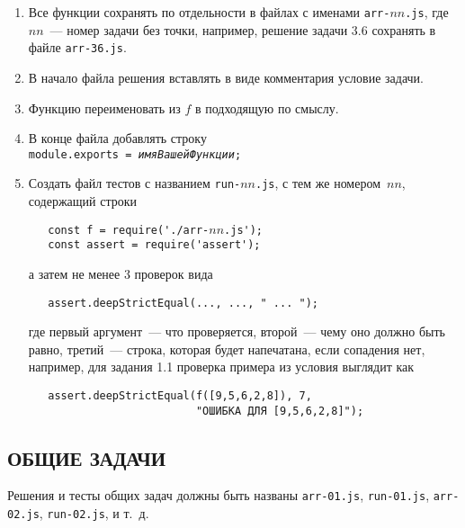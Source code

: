 \documentclass{article}
\begin{document}
\begin{enumerate}[nolistsep]
    \item
    Все функции сохранять по отдельности в файлах с именами \texttt{arr-$nn$.js}, где $nn$~--- номер задачи без точки, например, решение задачи 3.6 сохранять в файле \texttt{arr-36.js}.
    \item
    В начало файла решения вставлять в виде комментария условие задачи. 
    \item
    Функцию переименовать из $f$ в подходящую по смыслу. 
    \item
    В конце файла добавлять строку
    \\[.7mm]
    \texttt{module.exports = \textit{имяВашейФункции};}
    \item
    Создать файл тестов с названием \texttt{run-$nn$.js}, с тем же номером~$nn$, содержащий строки

    \smallskip
    \verb!   const f = require('./arr-!$nn$\verb!.js');!\\
    \verb!   const assert = require('assert');!

    \smallskip
    \noindent
    а затем не менее 3 проверок вида 
    
    \smallskip
    \verb!   assert.deepStrictEqual(..., ..., " ... ");!

    \smallskip
    \noindent
    где первый аргумент~--- что проверяется, второй~--- чему оно должно быть равно,
    третий~--- строка, которая будет напечатана, если сопадения нет, например, для задания 1.1
    проверка примера из условия выглядит как

    \smallskip
    \verb!   assert.deepStrictEqual(f([9,5,6,2,8]), 7,!\\
    \verb!                          "ОШИБКА ДЛЯ [9,5,6,2,8]");!

\end{enumerate}

\subsection*{ОБЩИЕ ЗАДАЧИ}
\def\twodigit#1{%
\ifnum#1<10 0\fi 
\number#1}

Решения и тесты общих задач должны быть названы \texttt{arr-01.js}, \texttt{run-01.js}, \texttt{arr-02.js}, \texttt{run-02.js}, и т.~д.
\end{document}
